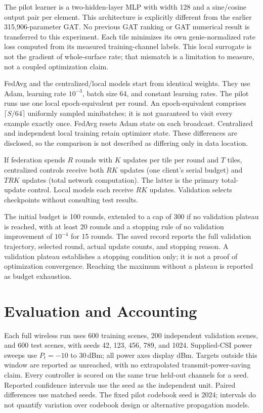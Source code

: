 \documentclass[journal]{IEEEtran}
\begin{document}
The pilot learner is a two-hidden-layer MLP with width 128 and a sine/cosine output pair per element. This architecture is explicitly different from the earlier 315,906-parameter GAT. No previous GAT ranking or GAT numerical result is transferred to this experiment. Each tile minimizes its own genie-normalized rate loss computed from its measured training-channel labels. This local surrogate is not the gradient of whole-surface rate; that mismatch is a limitation to measure, not a coupled optimization claim.

FedAvg and the centralized/local models start from identical weights. They use Adam, learning rate $10^{-3}$, batch size 64, and constant learning rates. The pilot runs use one local epoch-equivalent per round. An epoch-equivalent comprises $\lceil S/64\rceil$ uniformly sampled minibatches; it is not guaranteed to visit every example exactly once. FedAvg resets Adam state on each broadcast. Centralized and independent local training retain optimizer state. These differences are disclosed, so the comparison is not described as differing only in data location.

If federation spends $R$ rounds with $K$ updates per tile per round and $T$ tiles, centralized controls receive both $RK$ updates (one client's serial budget) and $TRK$ updates (total network computation). The latter is the primary total-update control. Local models each receive $RK$ updates. Validation selects checkpoints without consulting test results.

The initial budget is 100 rounds, extended to a cap of 300 if no validation plateau is reached, with at least 20 rounds and a stopping rule of no validation improvement of $10^{-4}$ for 15 rounds. The saved record reports the full validation trajectory, selected round, actual update counts, and stopping reason. A validation plateau establishes a stopping condition only; it is not a proof of optimization convergence. Reaching the maximum without a plateau is reported as budget exhaustion.

\section{Evaluation and Accounting}
Each full wireless run uses 600 training scenes, 200 independent validation scenes, and 600 test scenes, with seeds 42, 123, 456, 789, and 1024. Supplied-CSI power sweeps use $P_t=-10$ to $30$\,dBm; all power axes display dBm. Targets outside this window are reported as unreached, with no extrapolated transmit-power-saving claim. Every controller is scored on the same true held-out channels for a seed. Reported confidence intervals use the seed as the independent unit. Paired differences use matched seeds. The fixed pilot codebook seed is 2024; intervals do not quantify variation over codebook design or alternative propagation models.
\end{document}
